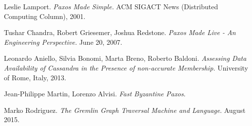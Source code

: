 \begin{thebibliography}{99}
   Leslie Lamport.
  	\newblock \textit{Paxos Made Simple.}
  	\newblock ACM SIGACT News (Distributed Computing Column), 2001.

   Tushar Chandra, Robert Griesemer, Joshua Redstone.
  	\newblock \textit{Paxos Made Live - An Engineering Perspective.}
  	\newblock June 20, 2007.

   Leonardo Aniello, Silvia Bonomi, Marta Breno, Roberto Baldoni.
    \newblock \textit{Assessing Data Availability of Cassandra in the Presence
of non-accurate Membership.}
	\newblock University of Rome, Italy, 2013.
  
   Jean-Philippe Martin, Lorenzo Alvisi.
    \newblock \textit{Fast Byzantine Paxos}.

   Marko Rodriguez.
    \newblock \textit{The Gremlin Graph Traversal Machine and Language}.
    \newblock August 2015.
\end{thebibliography}